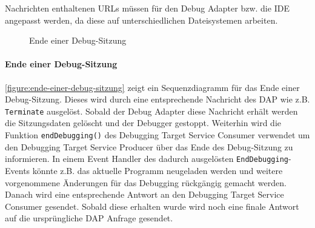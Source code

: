 Nachrichten enthaltenen URLs müssen für den Debug Adapter bzw. die IDE angepasst werden, da diese auf unterschiedlichen Dateisystemen arbeiten.

\begin{figure}[tbp]
    \centering
    \caption{Ende einer Debug-Sitzung}
    \label{figure:ende-einer-debug-sitzung}
\end{figure}

\paragraph{Ende einer Debug-Sitzung} \autoref{figure:ende-einer-debug-sitzung} zeigt ein Sequenzdiagramm für das Ende einer Debug-Sitzung. Dieses wird durch eine entsprechende Nachricht des \ac{DAP} wie z.B. \texttt{Terminate} ausgelöst. Sobald der Debug Adapter diese Nachricht erhält werden die Sitzungsdaten gelöscht und der Debugger gestoppt. Weiterhin wird die Funktion \texttt{endDebugging()} des Debugging Target Service Consumer verwendet um den Debugging Target Service Producer über das Ende des Debug-Sitzung zu informieren. In einem Event Handler des dadurch ausgelösten \texttt{EndDebugging}-Events könnte z.B. das aktuelle Programm neugeladen werden und weitere vorgenommene Änderungen für das Debugging rückgängig gemacht werden. Danach wird eine entsprechende Antwort an den Debugging Target Service Consumer gesendet. Sobald diese erhalten wurde wird noch eine finale Antwort auf die ursprüngliche \ac{DAP} Anfrage gesendet.

